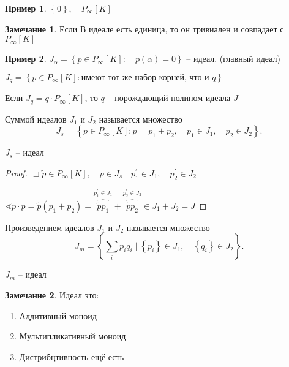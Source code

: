 \documentclass{book}
\newcommand{\p}[1]{#1^{\prime}}
\newcommand{\tl}[1]{\widetilde{#1}}
\theoremstyle{definition}
\newtheorem*{note}{Замечание}
\newtheorem*{example}{Пример}
\begin{document}
\begin{example}
    $\left\{ 0 \right\} ,\quad P_{\infty }[K]$ 

    \begin{note}
        Если В идеале есть единица, то он тривиален и совпадает с $P_{\infty }[K]$
    \end{note}
\end{example}

\begin{example}
    $J_{\alpha} = \left\{ p\in P_{\infty }[K]:\quad p(\alpha) = 0 \right\}$ -- идеал. (главный идеал)

    $J_q = \left\{ p\in P_{\infty }[K]:  \text{имеют тот же набор корней, что и } q \right\} $
\end{example}

\begin{definition}
    Если $J_q = q\cdot P_{\infty }[K]$, то $q$ -- порождающий полином идеала  $J$
\end{definition}

\begin{definition}
    Суммой идеалов $J_1$ и $J_2$ называется множество \[
    J_s = \left\{ p\in P_{\infty }[K] :p=p_1+p_2,\quad p_1\in J_1,\quad p_2\in J_2 \right\} 
    .\] 
\end{definition}
\begin{lemma}
    $J_s$ -- идеал
\end{lemma}
\begin{proof}
    $\sqsupset \tl p\in P_{\infty }[K],\quad p\in J_s\quad \p p_1\in J_1,\quad \p p_2\in J_2$

    $\sphericalangle \tl p \cdot  p = \tl p\left( p_1+p_2 \right)  = \overbrace{\tl pp_1}^{\p p_1\in J_1} + \overbrace{\tl pp_2}^{\p p_2\in J_2}\in J_1 + J_2 = J$
\end{proof}

\begin{definition}
    Произведением идеалов $J_1$ и $J_2$ называется множество \[
        J_m = \left\{ \sum_i p_iq_i\mid \left\{ p_i \right\} \in J_1,\quad \left\{ q_i \right\} \in J_2 \right\} 
    .\] 
\end{definition}
\begin{lemma}
    $J_m$ -- идеал
\end{lemma}
\begin{note}
    Идеал это:
    \begin{enumerate}
        \item Аддитивный моноид
        \item Мультипликативный моноид
        \item Дистрибцтивность ещё есть
    \end{enumerate}
\end{note}
\end{document}
